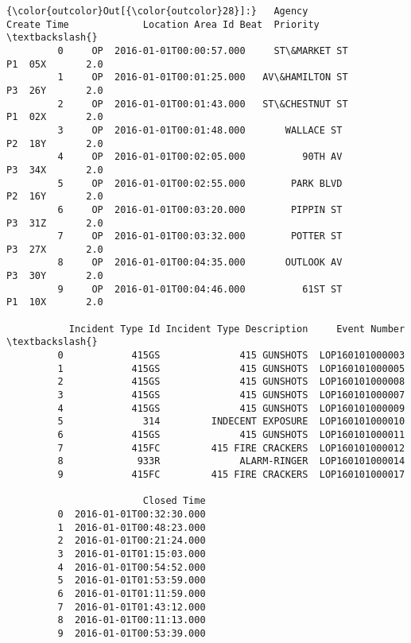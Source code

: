 \documentclass[11pt]{article}
\begin{document}
\begin{Verbatim}[commandchars=\\\{\}]
{\color{outcolor}Out[{\color{outcolor}28}]:}   Agency              Create Time             Location Area Id Beat  Priority  \textbackslash{}
         0     OP  2016-01-01T00:00:57.000     ST\&MARKET ST          P1  05X       2.0   
         1     OP  2016-01-01T00:01:25.000   AV\&HAMILTON ST          P3  26Y       2.0   
         2     OP  2016-01-01T00:01:43.000   ST\&CHESTNUT ST          P1  02X       2.0   
         3     OP  2016-01-01T00:01:48.000       WALLACE ST          P2  18Y       2.0   
         4     OP  2016-01-01T00:02:05.000          90TH AV          P3  34X       2.0   
         5     OP  2016-01-01T00:02:55.000        PARK BLVD          P2  16Y       2.0   
         6     OP  2016-01-01T00:03:20.000        PIPPIN ST          P3  31Z       2.0   
         7     OP  2016-01-01T00:03:32.000        POTTER ST          P3  27X       2.0   
         8     OP  2016-01-01T00:04:35.000       OUTLOOK AV          P3  30Y       2.0   
         9     OP  2016-01-01T00:04:46.000          61ST ST          P1  10X       2.0   
         
           Incident Type Id Incident Type Description     Event Number  \textbackslash{}
         0            415GS              415 GUNSHOTS  LOP160101000003   
         1            415GS              415 GUNSHOTS  LOP160101000005   
         2            415GS              415 GUNSHOTS  LOP160101000008   
         3            415GS              415 GUNSHOTS  LOP160101000007   
         4            415GS              415 GUNSHOTS  LOP160101000009   
         5              314         INDECENT EXPOSURE  LOP160101000010   
         6            415GS              415 GUNSHOTS  LOP160101000011   
         7            415FC         415 FIRE CRACKERS  LOP160101000012   
         8             933R              ALARM-RINGER  LOP160101000014   
         9            415FC         415 FIRE CRACKERS  LOP160101000017   
         
                        Closed Time  
         0  2016-01-01T00:32:30.000  
         1  2016-01-01T00:48:23.000  
         2  2016-01-01T00:21:24.000  
         3  2016-01-01T01:15:03.000  
         4  2016-01-01T00:54:52.000  
         5  2016-01-01T01:53:59.000  
         6  2016-01-01T01:11:59.000  
         7  2016-01-01T01:43:12.000  
         8  2016-01-01T00:11:13.000  
         9  2016-01-01T00:53:39.000  
\end{Verbatim}
            
\end{document}
